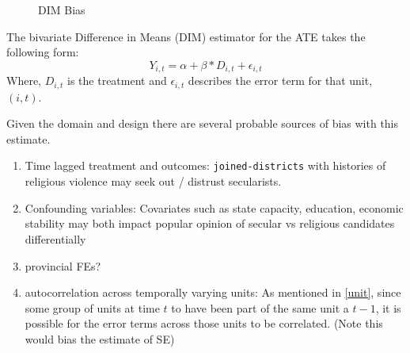 \documentclass{scrartcl}
\begin{document}
\begin{figure}[h]
  \centering
  \caption{DIM Bias}
  \label{fig:ate_dim}
\end{figure}

The bivariate Difference in Means (DIM) estimator for the ATE takes the following form: 
\begin{equation} \label{eq:1}
  Y_{i,t} = \alpha + \beta * D_{i,t} + \epsilon_{i,t}
\end{equation}
Where, $D_{i,t}$ is the treatment and $\epsilon_{i,t}$ describes the error term for that unit, $(i,t)$.

Given the domain and design there are several probable sources of bias with this estimate.

\begin{enumerate}
\item  Time lagged treatment and outcomes: \texttt{joined-districts} with histories of religious violence may seek out / distrust secularists. 
\item Confounding variables: Covariates such as state capacity, education, economic stability may both impact popular opinion of secular vs religious candidates differentially
\item provincial FEs?
\item autocorrelation across temporally varying units: As mentioned in \ref{unit}, since some group of units at time $t$ to have been part of the same unit a $t-1$, it is possible for the error terms across those units to be correlated. (Note this would bias the estimate of SE)
\end{enumerate}
\end{document}
